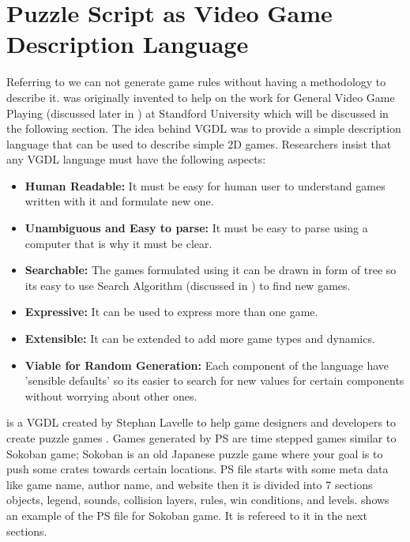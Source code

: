 \section{Puzzle Script as Video Game Description Language}
Referring to  we can not generate game rules without having a methodology to describe it.  was originally invented to help on the work for General Video Game Playing (discussed later in ) at Standford University which will be discussed in the following section. The idea behind VGDL was to provide a simple description language that can be used to describe simple 2D games. Researchers insist that any VGDL language must have the following aspects:\cite{vgdl}
\begin{itemize}\itemsep0pt \parskip0pt 
	\item \textbf{Human Readable:} It must be easy for human user to understand games written with it and formulate new one.
	\item \textbf{Unambiguous and Easy to parse:} It must be easy to parse using a computer that is why it must be clear.
	\item \textbf{Searchable:} The games formulated using it can be drawn in form of tree so its easy to use Search Algorithm (discussed in ) to find new games.
	\item \textbf{Expressive:} It can be used to express more than one game.
	\item \textbf{Extensible:} It can be extended to add more game types and dynamics.
	\item \textbf{Viable for Random Generation:} Each component of the language have 'sensible defaults' so its easier to search for new values for certain components without worrying about other ones.
\end{itemize}

 is a VGDL created by Stephan Lavelle to help game designers and developers to create puzzle games \cite{puzzleScript}. Games generated by PS are time stepped games similar to Sokoban game; Sokoban is an old Japanese puzzle game where your goal is to push some crates towards certain locations\cite{sokoban}. PS file starts with some meta data like game name, author name, and website then it is divided into 7 sections objects, legend, sounds, collision layers, rules, win conditions, and levels.  shows an example of the PS file for Sokoban game. It is refereed to it in the next sections.
